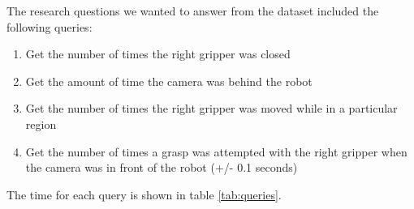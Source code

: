 \documentclass[nocopyrightspace]{acm_proc_article-sp}
\begin{document}

The research questions we wanted to answer from the dataset included the following queries:
\begin{enumerate}[label=Q\arabic*]
    \item Get the number of times the right gripper was closed
    \item Get the amount of time the camera was behind the robot
    \item Get the number of times the right gripper was moved while in a particular region
    \item Get the number of times a grasp was attempted with the right gripper when the camera was in front of the robot (+/- 0.1 seconds)
\end{enumerate}

The time for each query is shown in table \ref{tab:queries}.
\end{document}
